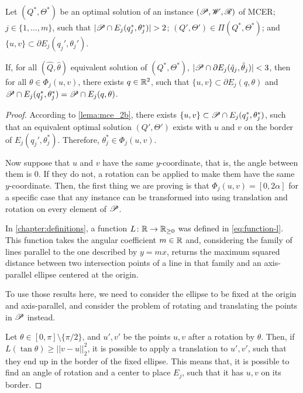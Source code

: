 \begin{lema}\label{lema:3pnts}
Let $(Q^*, \Theta^*)$ be an optimal solution of an instance $(\mathscr{P}, \mathscr{W}, \mathscr{R})$ of MCER; $j\in\{1, \dots, m\}$, such that $|\Pp \cap E_j(q_j^*, \theta_j^*)|>2$; $(Q', \Theta')\in\Pi(Q^*, \Theta^*)$; and $\{u, v\}\subset \partial E_j(q_j', \theta_j')$.

If, for all $(\hat{Q}, \hat{\theta})$ equivalent solution of $(Q^*, \Theta^*)$, $|\mathscr{P}\cap \partial E_j(\hat{q}_j, \hat{\theta}_j)| < 3$, then for all $\theta\in\Phi_j(u,v)$, there exists $q\in\mathbb{R}^2$, such that $\{u, v\} \subset \partial E_j(q, \theta)$ and $\mathscr{P} \cap E_j(q^*_j, \theta^*_j) = \mathscr{P} \cap E_j(q, \theta)$.

\end{lema}

\begin{proof}
	According to \autoref{lema:mce_2b}, there exists $\{u, v\} \subset \mathscr{P} \cap E_j(q^*_j, \theta^*_j)$, such that an equivalent optimal solution $(Q', \Theta')$ exists with $u$ and $v$ on the border of $E_j(q_j', \theta_j^*)$. Therefore, $\theta_j^*\in\Phi_j(u,v)$.
	
	Now suppose that $u$ and $v$ have the same $y$-coordinate, that is, the angle between them is $0$. If they do not, a rotation can be applied to make them have the same $y$-coordinate. Then, the first thing we are proving is that $\Phi_j(u, v) = [0, 2\alpha]$ for a specific case that any instance can be transformed into using translation and rotation on every element of $\mathscr{P}$.
	
	In \autoref{chapter:definitions}, a function $L\colon \mathbb{R} \to \mathbb{R}_{\ge0}$ was defined in \autoref{eq:function-l}. This function takes the angular coefficient $m\in\mathbb{R}$ and, considering the family of lines parallel to the one described by $y=mx$, returns the maximum squared distance between two intersection points of a line in that family and an axis-parallel ellipse centered at the origin.
	
	To use those results here, we need to consider the ellipse to be fixed at the origin and axis-parallel, and consider the problem of rotating and translating the points in $\mathscr{P}$ instead. 
	
	Let $\theta \in [0, \pi]\setminus\{\pi/2\}$, and $u', v'$ be the points $u, v$ after a rotation by $\theta$. Then, if $L(\tan{\theta}) \ge ||v-u||_2^2$, it is possible to apply a translation to $u',v'$, such that they end up in the border of the fixed ellipse. This means that, it is possible to find an angle of rotation and a center to place $E_j$, such that it has $u, v$ on its border. 
	

\end{proof}
